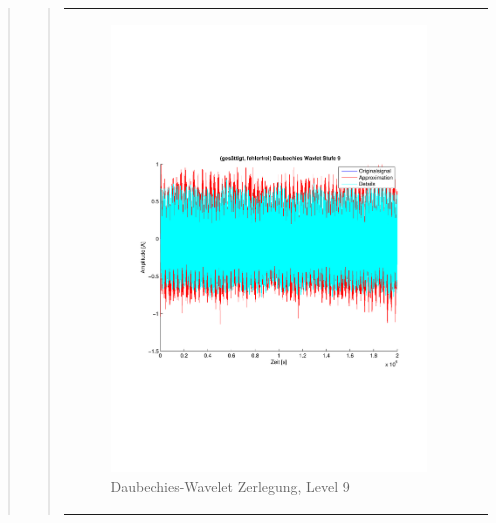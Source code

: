 \begin{quote}
\begin{quote}
\begin{center}
\begin{tabular}{ll}
\begin{minipage}{0.6\textwidth}
                    \end{minipage}
                    \begin{minipage}{0.6\textwidth}
    
                        \begin{figure}[H]
                            \label{fig:}
                            \includegraphics[scale=0.4, trim = 2cm 6cm 1cm
                            7.5cm,
                            clip]{./Bilder/Termin8/fehlerfrei_gesaettigt_Daubechies_Wavlet_lvl_9}
                            \caption{Daubechies-Wavelet Zerlegung, Level 9}
                        \end{figure}
                    \vspace{-1.5em}
    
                    \end{minipage}
    

\end{tabular}
\end{center}
\end{quote}
\end{quote}
